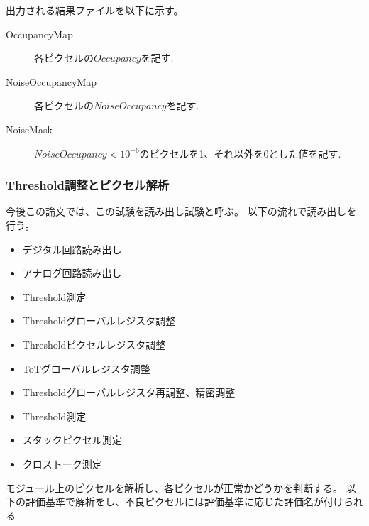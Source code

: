 出力される結果ファイルを以下に示す。
\begin{description}
  \item [OccupancyMap] 各ピクセルの$Occupancy$を記す.
  \item [NoiseOccupancyMap] 各ピクセルの$NoiseOccupancy$を記す.
  \item [NoiseMask] $NoiseOccupancy < 10^{-6}$のピクセルを1、それ以外を0とした値を記す.
\end{description}
  
\subsubsection{Threshold調整とピクセル解析}\label{sec:pixel_analysis}
今後この論文では、この試験を読み出し試験と呼ぶ。
以下の流れで読み出しを行う。
\begin{itemize}
  \item デジタル回路読み出し
  \item アナログ回路読み出し
  \item Threshold測定
  \item Thresholdグローバルレジスタ調整
  \item Thresholdピクセルレジスタ調整
  \item ToTグローバルレジスタ調整
  \item Thresholdグローバルレジスタ再調整、精密調整
  \item Threshold測定
  \item スタックピクセル測定
  \item クロストーク測定
\end{itemize}

モジュール上のピクセルを解析し、各ピクセルが正常かどうかを判断する。
以下の評価基準で解析をし、不良ピクセルには評価基準に応じた評価名が付けられる

